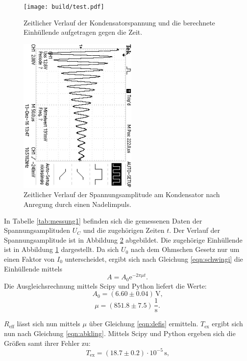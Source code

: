 \begin{figure}
	\centering
	\texttt{[image: build/test.pdf]}
	\caption{Zeitlicher Verlauf der Kondensatorspannung und die berechnete Einhüllende aufgetragen gegen die Zeit.}
	\label{fig:einhüllende}
\end{figure}
\begin{figure}
	\centering
	\includegraphics[width=0.52\textwidth,angle=90]{Bilder/a)correct/F0002TEK.JPG}
	\caption{Zeitlicher Verlauf der Spannungsamplitude am Kondensator nach Anregung durch einen Nadelimpuls.}
	\label{fig:spannungsamplitude}
\end{figure}
In Tabelle \ref{tab:messung1} befinden sich die gemessenen Daten der Spannungsamplituden $U_C$ und die zugehörigen Zeiten $t$.
Der Verlauf der Spannungsamplitude ist in Abbildung \ref{fig:spannungsamplitude} abgebildet. Die zugehörige Einhüllende ist in Abbildung \ref{fig:einhüllende} dargestellt.
Da sich $U_\text{0}$ nach dem Ohmschen Gesetz nur um einen Faktor von $I_\text{0}$ unterscheidet, ergibt sich nach Gleichung \eqref{eqn:schwingi} die Einhüllende mittels
\begin{equation}
	A=A_\text{0} \mathrm{e}^{-2 \pi \mu t} \text{.}
\end{equation}
Die Ausgleichsrechnung mittels Scipy und Python liefert die Werte:
\begin{equation*}
	A_0 =  (6.60 \pm 0.04) \,\si{\volt} \text{,}
\end{equation*}
\begin{equation*}
	\mu =  (851.8 \pm 7.5) \, \frac{1}{\si{\second}} \text{.}
\end{equation*}

$R_\text{eff}$ lässt sich nun mittels $\mu$ über Gleichung \eqref{eqn:defis} ermitteln. $T_\text{ex}$ ergibt sich nun nach Gleichung \eqref{eqn:abkling}.
Mittels Scipy und Python ergeben sich die Größen samt ihrer Fehler zu:
\begin{equation*}
	T_{\text{ex}}=(18.7 \pm 0.2) \cdot 10^{-5}\,\si{\second} \text{,}
\end{equation*}

